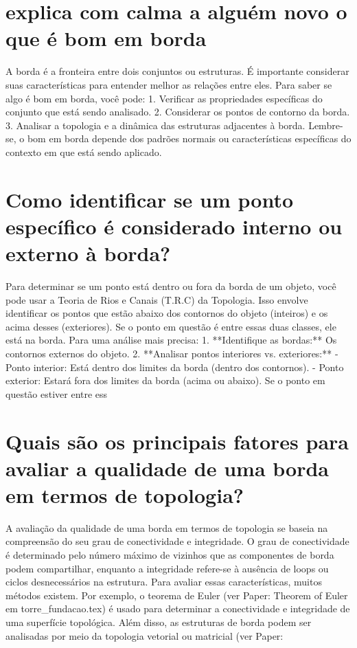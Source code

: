 \documentclass[11pt,a4paper]{article}
\begin{document}
\section{explica com calma a alguém novo o que é bom em borda}
A borda é a fronteira entre dois conjuntos ou estruturas. É importante considerar suas características para entender melhor as relações entre eles. Para saber se algo é bom em borda, você pode: 1. Verificar as propriedades específicas do conjunto que está sendo analisado. 2. Considerar os pontos de contorno da borda. 3. Analisar a topologia e a dinâmica das estruturas adjacentes à borda. Lembre-se, o bom em borda depende dos padrões normais ou características específicas do contexto em que está sendo aplicado.

\section{Como identificar se um ponto específico é considerado interno ou externo à borda?}
Para determinar se um ponto está dentro ou fora da borda de um objeto, você pode usar a Teoria de Rios e Canais (T.R.C) da Topologia. Isso envolve identificar os pontos que estão abaixo dos contornos do objeto (inteiros) e os acima desses (exteriores). Se o ponto em questão é entre essas duas classes, ele está na borda. Para uma análise mais precisa: 1. **Identifique as bordas:** Os contornos externos do objeto. 2. **Analisar pontos interiores vs. exteriores:** - Ponto interior: Está dentro dos limites da borda (dentro dos contornos). - Ponto exterior: Estará fora dos limites da borda (acima ou abaixo). Se o ponto em questão estiver entre ess

\section{Quais são os principais fatores para avaliar a qualidade de uma borda em termos de topologia?}
A avaliação da qualidade de uma borda em termos de topologia se baseia na compreensão do seu grau de conectividade e integridade. O grau de conectividade é determinado pelo número máximo de vizinhos que as componentes de borda podem compartilhar, enquanto a integridade refere-se à ausência de loops ou ciclos desnecessários na estrutura. Para avaliar essas características, muitos métodos existem. Por exemplo, o teorema de Euler (ver Paper: Theorem of Euler em torre\_fundacao.tex) é usado para determinar a conectividade e integridade de uma superfície topológica. Além disso, as estruturas de borda podem ser analisadas por meio da topologia vetorial ou matricial (ver Paper: 
\end{document}

